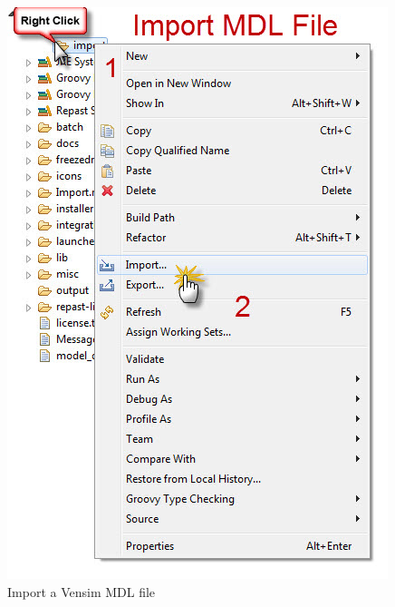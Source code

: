 \documentclass[11pt]{amsart}
\begin{document}
\begin{figure}[ht]
\begin{center}
\vspace{.2in}
\centerline {
\includegraphics[totalheight=0.6\textheight]{images/045.jpg}
}
\caption{Import a Vensim MDL file}
\label{fig:045}
\end{center}
\end{figure}


\clearpage
\end{document}
